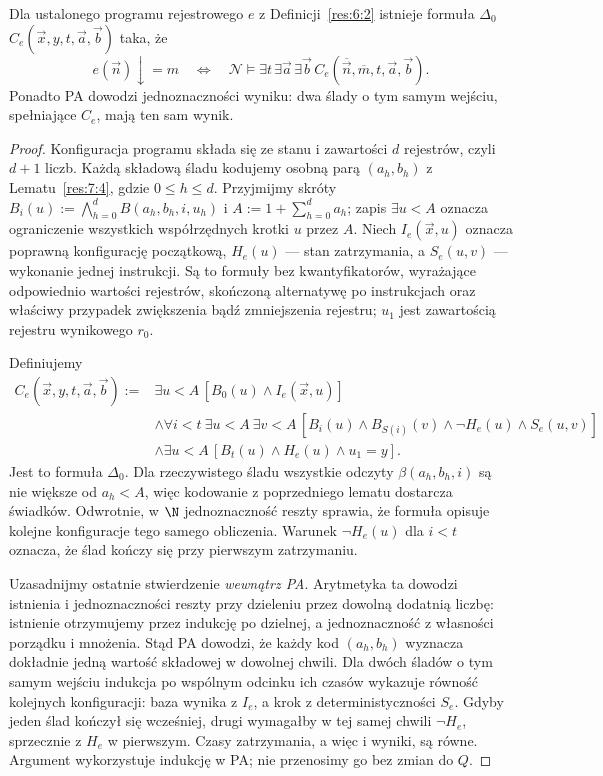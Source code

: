 \begin{lemat}\label{res:7:5}
Dla ustalonego programu rejestrowego $e$ z Definicji~\ref{res:6:2} istnieje formuła $\Delta_0$ $C_e(\vec x,y,t,\vec a,\vec b)$ taka, że
\[
e(\vec n)\downarrow=m\quad\Longleftrightarrow\quad
\mathcal N\models\exists t\,\exists\vec a\,\exists\vec b\,
C_e(\overline{\vec n},\overline m,t,\vec a,\vec b).
\]
Ponadto PA dowodzi jednoznaczności wyniku: dwa ślady o tym samym wejściu, spełniające $C_e$, mają ten sam wynik.
\end{lemat}
\begin{proof}
Konfiguracja programu składa się ze stanu i zawartości $d$ rejestrów, czyli $d+1$ liczb. Każdą składową śladu kodujemy osobną parą $(a_h,b_h)$ z Lematu~\ref{res:7:4}, gdzie $0\le h\le d$. Przyjmijmy skróty
$B_i(u):=\bigwedge_{h=0}^d B(a_h,b_h,i,u_h)$ i
$A:=1+\sum_{h=0}^d a_h$; zapis $\exists u<A$ oznacza ograniczenie wszystkich współrzędnych krotki $u$ przez $A$.
Niech $I_e(\vec x,u)$ oznacza poprawną konfigurację początkową, $H_e(u)$ --- stan zatrzymania, a $S_e(u,v)$ --- wykonanie jednej instrukcji. Są to formuły bez kwantyfikatorów, wyrażające odpowiednio wartości rejestrów, skończoną alternatywę po instrukcjach oraz właściwy przypadek zwiększenia bądź zmniejszenia rejestru; $u_1$ jest zawartością rejestru wynikowego $r_0$.

Definiujemy
\begin{align*}
C_e(\vec x,y,t,\vec a,\vec b):={}&
\exists u<A\,[B_0(u)\land I_e(\vec x,u)]\\
&\land\forall i<t\ \exists u<A\ \exists v<A\,
[B_i(u)\land B_{S(i)}(v)\land\neg H_e(u)\land S_e(u,v)]\\
&\land\exists u<A\,[B_t(u)\land H_e(u)\land u_1=y].
\end{align*}
Jest to formuła $\Delta_0$. Dla rzeczywistego śladu wszystkie odczyty $\beta(a_h,b_h,i)$ są nie większe od $a_h<A$, więc kodowanie z poprzedniego lematu dostarcza świadków. Odwrotnie, w $\N$ jednoznaczność reszty sprawia, że formuła opisuje kolejne konfiguracje tego samego obliczenia. Warunek $\neg H_e(u)$ dla $i<t$ oznacza, że ślad kończy się przy pierwszym zatrzymaniu.

Uzasadnijmy ostatnie stwierdzenie \emph{wewnątrz PA}. Arytmetyka ta dowodzi istnienia i jednoznaczności reszty przy dzieleniu przez dowolną dodatnią liczbę: istnienie otrzymujemy przez indukcję po dzielnej, a jednoznaczność z własności porządku i mnożenia. Stąd PA dowodzi, że każdy kod $(a_h,b_h)$ wyznacza dokładnie jedną wartość składowej w dowolnej chwili. Dla dwóch śladów o tym samym wejściu indukcja po wspólnym odcinku ich czasów wykazuje równość kolejnych konfiguracji: baza wynika z $I_e$, a krok z deterministyczności $S_e$. Gdyby jeden ślad kończył się wcześniej, drugi wymagałby w tej samej chwili $\neg H_e$, sprzecznie z $H_e$ w pierwszym. Czasy zatrzymania, a więc i wyniki, są równe. Argument wykorzystuje indukcję w PA; nie przenosimy go bez zmian do $Q$.
\end{proof}

